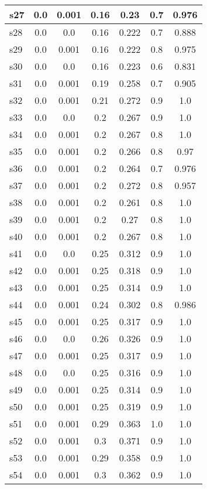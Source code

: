 \documentclass{article}
\begin{document}
\begin{tabular}{|l|c|c|c|c|c|c|}
\hline
s27 &0.0 & 0.001 & 0.16 & 0.23 & 0.7 & 0.976\\
\hline
s28 &0.0 & 0.0 & 0.16 & 0.222 & 0.7 & 0.888\\
\hline
s29 &0.0 & 0.001 & 0.16 & 0.222 & 0.8 & 0.975\\
\hline
s30 &0.0 & 0.0 & 0.16 & 0.223 & 0.6 & 0.831\\
\hline
s31 &0.0 & 0.001 & 0.19 & 0.258 & 0.7 & 0.905\\
\hline
s32 &0.0 & 0.001 & 0.21 & 0.272 & 0.9 & 1.0\\
\hline
s33 &0.0 & 0.0 & 0.2 & 0.267 & 0.9 & 1.0\\
\hline
s34 &0.0 & 0.001 & 0.2 & 0.267 & 0.8 & 1.0\\
\hline
s35 &0.0 & 0.001 & 0.2 & 0.266 & 0.8 & 0.97\\
\hline
s36 &0.0 & 0.001 & 0.2 & 0.264 & 0.7 & 0.976\\
\hline
s37 &0.0 & 0.001 & 0.2 & 0.272 & 0.8 & 0.957\\
\hline
s38 &0.0 & 0.001 & 0.2 & 0.261 & 0.8 & 1.0\\
\hline
s39 &0.0 & 0.001 & 0.2 & 0.27 & 0.8 & 1.0\\
\hline
s40 &0.0 & 0.001 & 0.2 & 0.267 & 0.8 & 1.0\\
\hline
s41 &0.0 & 0.0 & 0.25 & 0.312 & 0.9 & 1.0\\
\hline
s42 &0.0 & 0.001 & 0.25 & 0.318 & 0.9 & 1.0\\
\hline
s43 &0.0 & 0.001 & 0.25 & 0.314 & 0.9 & 1.0\\
\hline
s44 &0.0 & 0.001 & 0.24 & 0.302 & 0.8 & 0.986\\
\hline
s45 &0.0 & 0.001 & 0.25 & 0.317 & 0.9 & 1.0\\
\hline
s46 &0.0 & 0.0 & 0.26 & 0.326 & 0.9 & 1.0\\
\hline
s47 &0.0 & 0.001 & 0.25 & 0.317 & 0.9 & 1.0\\
\hline
s48 &0.0 & 0.0 & 0.25 & 0.316 & 0.9 & 1.0\\
\hline
s49 &0.0 & 0.001 & 0.25 & 0.314 & 0.9 & 1.0\\
\hline
s50 &0.0 & 0.001 & 0.25 & 0.319 & 0.9 & 1.0\\
\hline
s51 &0.0 & 0.001 & 0.29 & 0.363 & 1.0 & 1.0\\
\hline
s52 &0.0 & 0.001 & 0.3 & 0.371 & 0.9 & 1.0\\
\hline
s53 &0.0 & 0.001 & 0.29 & 0.358 & 0.9 & 1.0\\
\hline
s54 &0.0 & 0.001 & 0.3 & 0.362 & 0.9 & 1.0\\
\hline

\end{tabular}
\end{document}
